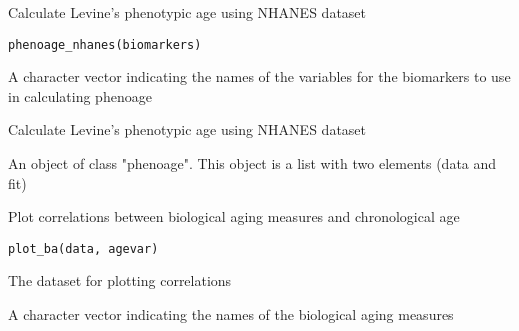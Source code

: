 \documentclass[a4paper]{book}
\begin{document}
%
\begin{Description}\relax
Calculate Levine's phenotypic age using NHANES dataset
\end{Description}
%
\begin{Usage}
\begin{verbatim}
phenoage_nhanes(biomarkers)
\end{verbatim}
\end{Usage}
%
\begin{Arguments}
\begin{ldescription}
\item[\code{biomarkers}] A character vector indicating the names of the variables for the biomarkers to use in calculating phenoage
\end{ldescription}
\end{Arguments}
%
\begin{Details}\relax
Calculate Levine's phenotypic age using NHANES dataset
\end{Details}
%
\begin{Value}
An object of class "phenoage". This object is a list with two elements (data and fit)
\end{Value}
%
\begin{Examples}
\end{Examples}
%
\begin{Description}\relax
Plot correlations between biological aging measures and chronological age
\end{Description}
%
\begin{Usage}
\begin{verbatim}
plot_ba(data, agevar)
\end{verbatim}
\end{Usage}
%
\begin{Arguments}
\begin{ldescription}
\item[\code{data}] The dataset for plotting correlations

\item[\code{agevar}] A character vector indicating the names of the biological aging measures
\end{ldescription}
\end{Arguments}
\end{document}
